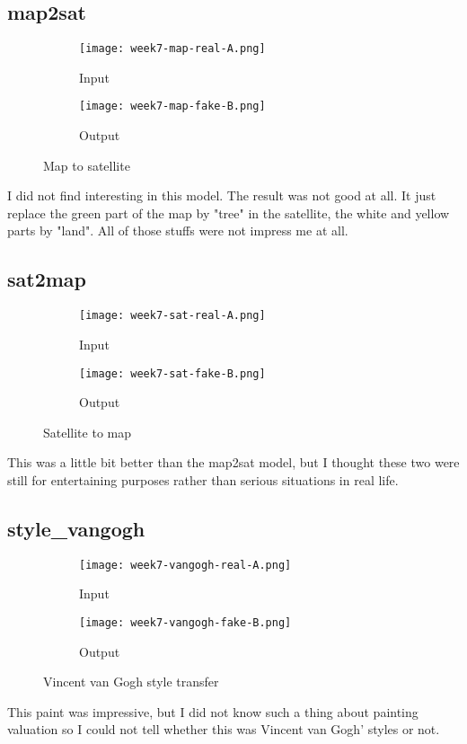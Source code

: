 \subsection{map2sat}
\newpage
\begin{figure}[!ht]
\centering
\begin{subfigure}{0.5\textwidth}
  \centering
  \texttt{[image: week7-map-real-A.png]}
  \caption{Input}
\end{subfigure}%
\begin{subfigure}{0.5\textwidth}
  \centering
  \texttt{[image: week7-map-fake-B.png]}
  \caption{Output}
\end{subfigure}
\caption{Map to satellite}
\end{figure}
I did not find interesting in this model. The result was not good at all. It just replace the green part of the map by "tree" in the satellite, the white and yellow parts by "land". All of those stuffs were not impress me at all.

\subsection{sat2map}
\begin{figure}[!ht]
\centering
\begin{subfigure}{0.5\textwidth}
  \centering
  \texttt{[image: week7-sat-real-A.png]}
  \caption{Input}
\end{subfigure}%
\begin{subfigure}{0.5\textwidth}
  \centering
  \texttt{[image: week7-sat-fake-B.png]}
  \caption{Output}
\end{subfigure}
\caption{Satellite to map}
\end{figure}
This was a little bit better than the map2sat model, but I thought these two were still for entertaining purposes rather than serious situations in real life.

\subsection{style\_vangogh}
\newpage
\begin{figure}[!ht]
\centering
\begin{subfigure}{0.5\textwidth}
  \centering
  \texttt{[image: week7-vangogh-real-A.png]}
  \caption{Input}
\end{subfigure}%
\begin{subfigure}{0.5\textwidth}
  \centering
  \texttt{[image: week7-vangogh-fake-B.png]}
  \caption{Output}
\end{subfigure}
\caption{Vincent van Gogh style transfer}
\end{figure}
This paint was impressive, but I did not know such a thing about painting valuation so I could not tell whether this was Vincent van Gogh' styles or not.

